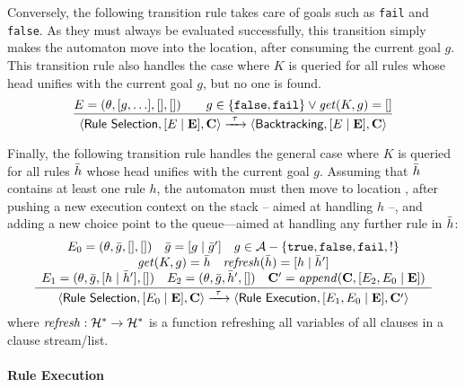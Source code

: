 \documentclass[12pt,a4paper,openright,twoside]{book}
\begin{document}
Conversely, the following transition rule takes care of goals such as \texttt{fail} and \texttt{false}.
%
As they must always be evaluated successfully, this transition simply makes the automaton move into the  location, after consuming the current goal $g$.
%
This transition rule also handles the case where $K$ is queried for all rules whose head unifies with the current goal $g$, but no one is found.
%
\[
\frac{
    E = (\theta, [g, \ldots], [], [])
    \qquad
    g \in \{ \mathtt{false}, \mathtt{fail} \} \lor \mathit{get}(K, g) = []
}{
    \langle \textsf{Rule Selection}, [E \mid \mathbf{E}], \mathbf{C} \rangle
    \xrightarrow{\ \tau\ }
    \langle \textsf{Backtracking}, [E \mid \mathbf{E}], \mathbf{C} \rangle
}
\]

Finally, the following transition rule handles the general case where $K$ is queried for all rules $\bar{h}$ whose head unifies with the current goal $g$.
%
Assuming that $\bar{h}$ contains at least one rule $h$, the automaton must then move to location , after pushing a new execution context on the stack -- aimed at handling $h$ --, and adding a new choice point to the queue---aimed at handling any further rule in $\bar{h}$:
%
%
\[
\frac{
    \begin{array}{c}
        E_0 = (\theta, \bar{g}, [], [])
        \quad
        \bar{g} = [g \mid \bar{g}']
        \quad
        g \in \mathcal{A} - \{ \mathtt{true}, \mathtt{false}, \mathtt{fail}, \mathtt{!} \}
        \\
        \mathit{get}(K, g) = \bar{h}
        \quad
        \mathit{refresh}(\bar{h}) = [h \mid \bar{h}']
        \\
        E_1 = (\theta, \bar{g}, [h \mid \bar{h}'], [])
        \quad
        E_2 = (\theta, \bar{g}, \bar{h}', [])
        \quad
        \mathbf{C}' = \mathit{append}(\mathbf{C}, [E_2, E_0 \mid \mathbf{E}])
    \end{array}
}{
    \langle \textsf{Rule Selection}, [E_0 \mid \mathbf{E}], \mathbf{C} \rangle
    \xrightarrow{\ \tau\ }
    \langle \textsf{Rule Execution}, [E_1, E_0 \mid \mathbf{E}], \mathbf{C}' \rangle
}
\]
%
where $\mathit{refresh} : \mathcal{H}^* \rightarrow \mathcal{H}^*$ is a function refreshing all variables of all clauses in a clause stream/list.

\paragraph{Rule Execution}
\end{document}
